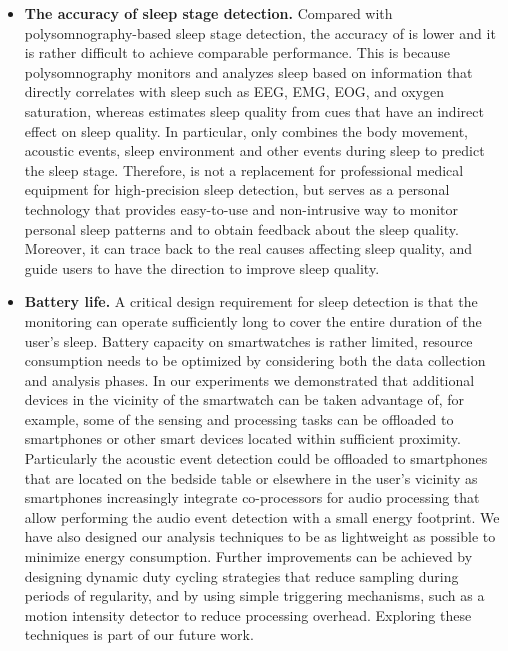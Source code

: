 \begin{itemize}
  \item \textbf{The accuracy of sleep stage detection.}
  Compared with polysomnography-based sleep stage detection, the accuracy of {\systemname} is lower and it is rather difficult to achieve comparable performance. This is because polysomnography monitors and analyzes sleep based on information that directly correlates with sleep such as EEG, EMG, EOG, and oxygen saturation, whereas {\systemname} estimates sleep quality from cues that have an indirect effect on sleep quality. In particular, \systemname only combines the body movement, acoustic events, sleep environment and other events during sleep to predict the sleep stage. Therefore, {\systemname} is not a replacement for professional medical equipment for high-precision sleep detection, but serves as a personal technology that provides easy-to-use and non-intrusive way to monitor personal sleep patterns and to obtain feedback about the sleep quality. Moreover, it can trace back to the real causes affecting sleep quality, and guide users to have the direction to improve sleep quality.%
  \item \textbf{Battery life.}
  A critical design requirement for sleep detection is that the monitoring can operate sufficiently long to cover the entire duration of the user's sleep. Battery capacity on smartwatches is rather limited, resource consumption needs to be optimized by considering both the data collection and analysis phases. In our experiments we demonstrated that additional devices in the vicinity of the smartwatch can be taken advantage of, for example, some of the sensing and processing tasks can be offloaded to smartphones or other smart devices located within sufficient proximity. Particularly the acoustic event detection could be offloaded to smartphones that are located on the bedside table or elsewhere in the user's vicinity as smartphones increasingly integrate co-processors for audio processing that allow performing the audio event detection with a small energy footprint. We have also designed our analysis techniques to be as lightweight as possible to minimize energy consumption. Further improvements can be achieved by designing dynamic duty cycling strategies that reduce sampling during periods of regularity, and by using simple triggering mechanisms, such as a motion intensity detector to reduce processing overhead. Exploring these techniques is part of our future work.%

\end{itemize}
